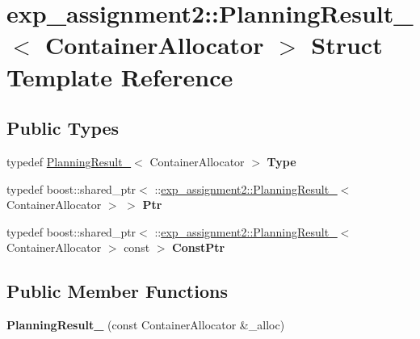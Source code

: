 \hypertarget{structexp__assignment2_1_1PlanningResult__}{}\section{exp\+\_\+assignment2\+:\+:Planning\+Result\+\_\+$<$ Container\+Allocator $>$ Struct Template Reference}
\label{structexp__assignment2_1_1PlanningResult__}
\subsection*{Public Types}
\begin{DoxyCompactItemize}
\item 
\mbox{\label{structexp__assignment2_1_1PlanningResult___a07c6fb38d07e2892c3fc41ae90ccd82f}} 
typedef \hyperlink{structexp__assignment2_1_1PlanningResult__}{Planning\+Result\+\_\+}$<$ Container\+Allocator $>$ {\bfseries Type}
\item 
\mbox{\label{structexp__assignment2_1_1PlanningResult___a24001c764d5625501df277668b1c11b8}} 
typedef boost\+::shared\+\_\+ptr$<$ \+::\hyperlink{structexp__assignment2_1_1PlanningResult__}{exp\+\_\+assignment2\+::\+Planning\+Result\+\_\+}$<$ Container\+Allocator $>$ $>$ {\bfseries Ptr}
\item 
\mbox{\label{structexp__assignment2_1_1PlanningResult___a5f28d0c41e9d902e9520796a78bfafe6}} 
typedef boost\+::shared\+\_\+ptr$<$ \+::\hyperlink{structexp__assignment2_1_1PlanningResult__}{exp\+\_\+assignment2\+::\+Planning\+Result\+\_\+}$<$ Container\+Allocator $>$ const  $>$ {\bfseries Const\+Ptr}
\end{DoxyCompactItemize}
\subsection*{Public Member Functions}
\begin{DoxyCompactItemize}
\item 
\mbox{\label{structexp__assignment2_1_1PlanningResult___a5dd47d71c3ccc91ccab3269f70dd2986}} 
{\bfseries Planning\+Result\+\_\+} (const Container\+Allocator \&\+\_\+alloc)
\end{DoxyCompactItemize}


